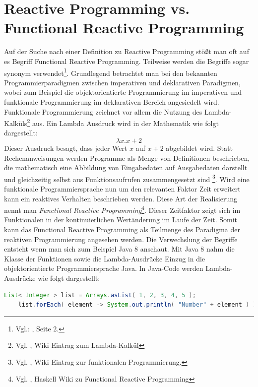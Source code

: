 \section{Reactive Programming vs. Functional Reactive Programming}
Auf der Suche nach einer Definition zu Reactive Programming stößt man oft auf es Begriff Functional Reactive Programming. Teilweise werden die Begriffe sogar synonym verwendet\footnote{Vgl.: \cite{Nurkiewicz.2017}, Seite 2.}. Grundlegend betrachtet man bei den bekannten Programmierparadigmen zwischen imperativen und deklarativen Paradigmen, wobei zum Beispiel die objektorientierte Programmierung im imperativen und funktionale Programmierung im deklarativen Bereich angesiedelt wird. Funktionale Programmierung zeichnet vor allem die Nutzung des Lambda-Kalküls\footnote{Vgl. \cite{lambda}, Wiki Eintrag zum Lambda-Kalkül} aus. Ein Lambda Ausdruck wird in der Mathematik wie folgt dargestellt:
\begin{displaymath}
	\lambda x.x+2
\end{displaymath}
Dieser Ausdruck besagt, dass jeder Wert $x$ auf $x+2$ abgebildet wird.
 Statt Rechenanweisungen werden Programme als Menge von Definitionen beschrieben, die mathematisch eine Abbildung von Eingabedaten auf Ausgabedaten darstellt und gleichzeitig selbst aus Funktionsaufrufen zusammengesetzt sind \footnote{Vgl. \cite{funktioprogrammierung}, Wiki Eintrag zur funktionalen Programmierung.}. Wird eine funktionale Programmiersprache nun um den relevanten Faktor Zeit erweitert kann ein reaktives Verhalten beschrieben werden. Diese Art der Realisierung nennt man \textit{Functional Reactive Programming}\footnote{Vgl. \cite{frp.haskell}, Haskell Wiki zu Functional Reactive Programming}. Dieser Zeitfaktor zeigt sich im Funktionalen in der kontinuierlichen Wertänderung im Laufe der Zeit. Somit kann das Functional Reactive Programming als Teilmenge des Paradigma der reaktiven Programmierung angesehen werden. Die Verwechslung der Begriffe entsteht wenn man sich zum Beispiel Java 8 anschaut. Mit Java 8 nahm die Klasse der Funktionen sowie die Lambda-Ausdrücke Einzug in die objektorientierte Programmiersprache Java. In Java-Code werden Lambda-Ausdrücke wie folgt dargestellt:
 \begin{lstlisting}[language=java, caption={Lambda Beispiel in Java}, label=lst.LambdaJava, frame=single]
 	List< Integer > list = Arrays.asList( 1, 2, 3, 4, 5 );
 	list.forEach( element -> System.out.println( "Number" + element ) );
 	 \end{lstlisting}
